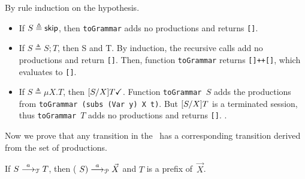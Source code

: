 \begin{itemizeproof}
  By rule induction  on the hypothesis.
  \begin{itemize}
  \item If $S\triangleq \mathsf{skip}$, then \lstinline{toGrammar} adds no
    productions and returns \lstinline{[]}.
  \item If $S\triangleq S;T$, then \DONE S and \DONE T. By induction,
    the recursive calls add no productions and return
    \lstinline|[]|. Then, function \lstinline|toGrammar| returns
    \lstinline|[]++[]|, which evaluates to \lstinline|[]|.
  \item If $S\triangleq \mu X. T$, then
    $[{S}/{X}]T \checkmark$.
    Function \lstinline|toGrammar |$S$ adds the productions from
    \lstinline|toGrammar (subs (Var y) X t)|. But $[{S}/{X}] T$ is a
    terminated session, thus \lstinline{toGrammar }$T$ adds no
    productions and returns \lstinline{[]}. .
  \end{itemize}
\end{itemizeproof}

Now we prove that any transition in the \LTS\ has a
corresponding transition derived from the set of productions.

\begin{lemma}
  If $S \stackrel{a}{\longrightarrow}_\mathcal T T$, then ( $S)
  \stackrel{a}{\longrightarrow}_\mathcal P \vec X$ and  $T$ is a
  prefix of~$\vec X$. 
%
\end{lemma}

